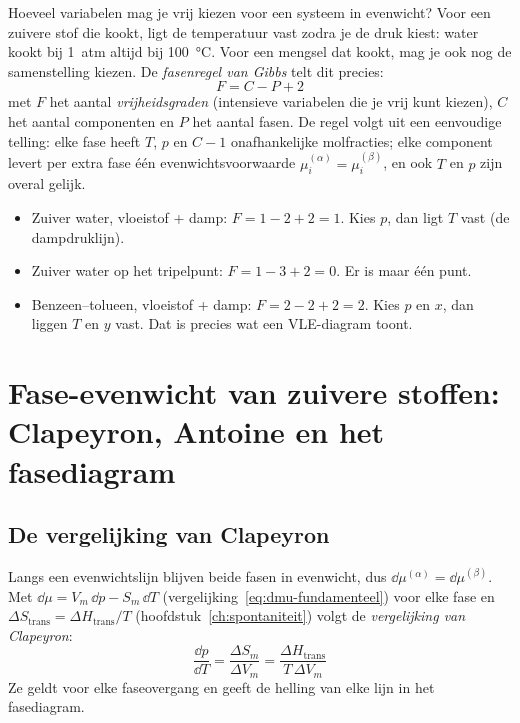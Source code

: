 Hoeveel variabelen mag je vrij kiezen voor een systeem in evenwicht? Voor een zuivere stof die kookt, ligt de temperatuur vast zodra je de druk kiest: water kookt bij \SI{1}{atm} altijd bij \SI{100}{\celsius}. Voor een mengsel dat kookt, mag je ook nog de samenstelling kiezen. De \emph{fasenregel van Gibbs} telt dit precies:
\begin{equation}
\boxed{F = C - P + 2}
\label{eq:fasenregel}
\end{equation}
met $F$ het aantal \emph{vrijheidsgraden} (intensieve variabelen die je vrij kunt kiezen), $C$ het aantal componenten en $P$ het aantal fasen. De regel volgt uit een eenvoudige telling: elke fase heeft $T$, $p$ en $C-1$ onafhankelijke molfracties; elke component levert per extra fase \'e\'en evenwichtsvoorwaarde $\mu_i^{(\alpha)} = \mu_i^{(\beta)}$, en ook $T$ en $p$ zijn overal gelijk.
\begin{itemize}
\item Zuiver water, vloeistof + damp: $F = 1 - 2 + 2 = 1$. Kies $p$, dan ligt $T$ vast (de dampdruklijn).
\item Zuiver water op het tripelpunt: $F = 1 - 3 + 2 = 0$. Er is maar \'e\'en punt.
\item Benzeen--tolueen, vloeistof + damp: $F = 2 - 2 + 2 = 2$. Kies $p$ en $x$, dan liggen $T$ en $y$ vast. Dat is precies wat een VLE-diagram toont.
\end{itemize}

\section{Fase-evenwicht van zuivere stoffen: Clapeyron, Antoine en het fasediagram}

\subsection{De vergelijking van Clapeyron}
\label{sec:clapeyron}

Langs een evenwichtslijn blijven beide fasen in evenwicht, dus $\dd{\mu^{(\alpha)}} = \dd{\mu^{(\beta)}}$. Met $\dd{\mu} = V_m\,\dd{p} - S_m\,\dd{T}$ (vergelijking~\eqref{eq:dmu-fundamenteel}) voor elke fase en $\Delta S_{\text{trans}} = \Delta H_{\text{trans}}/T$ (hoofdstuk~\ref{ch:spontaniteit}) volgt de \emph{vergelijking van Clapeyron}:
\begin{equation}
\boxed{\;\frac{\dd{p}}{\dd{T}} = \frac{\Delta S_m}{\Delta V_m} = \frac{\Delta H_{\text{trans}}}{T\,\Delta V_m}\;}
\label{eq:clapeyron}
\end{equation}
Ze geldt voor elke faseovergang en geeft de helling van elke lijn in het fasediagram.

